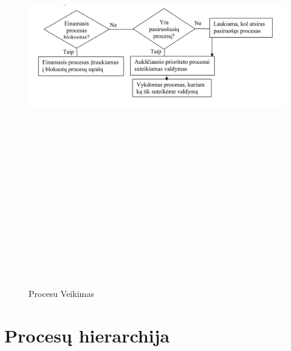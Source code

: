 \documentclass[oneside]{VUMIFPSkursinis}
\begin{document}
\begin{figure}[H]
		\centering	
	\includegraphics[width=18cm,height=20cm,keepaspectratio]{ProcesuVeikimas.png}
	\caption{Procesu Veikimas}
	\label{fig:Procesu Veikimas}
\end{figure}

\section{Procesų hierarchija}
\end{document}
